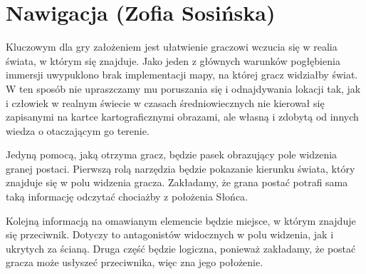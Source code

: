 \section{Nawigacja (Zofia Sosińska)}\label{chap:naw}

    Kluczowym dla gry założeniem jest ułatwienie graczowi wczucia się w realia świata, w którym się znajduje. Jako jeden z głównych warunków pogłębienia immersji uwypuklono brak implementacji mapy, na której gracz widziałby świat. W ten sposób nie upraszczamy mu poruszania się i odnajdywania lokacji tak, jak i człowiek w realnym świecie w czasach średniowiecznych nie kierował się zapisanymi na kartce kartograficznymi obrazami, ale własną i zdobytą od innych wiedza o otaczającym go terenie. 
    
    Jedyną pomocą, jaką otrzyma gracz, będzie pasek obrazujący pole widzenia granej postaci. Pierwszą rolą narzędzia będzie pokazanie kierunku świata, który znajduje się w polu widzenia gracza. Zakładamy, że grana postać potrafi sama taką informację odczytać chociażby z położenia Słońca.
    
    Kolejną informacją na omawianym elemencie będzie miejsce, w którym znajduje się przeciwnik. Dotyczy to antagonistów widocznych w polu widzenia, jak i ukrytych za ścianą. Druga część będzie 
    logiczna, ponieważ zakładamy, że postać gracza może usłyszeć przeciwnika, więc zna jego położenie.
